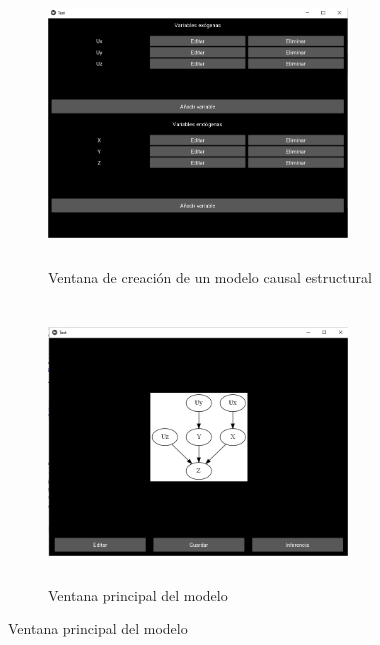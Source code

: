 \begin{figure}
	\centering
	\begin{subfigure}{\linewidth}
		\centering
		\includegraphics[width=300px, height=280px]{./images/Chapter-3/create-model}
		\caption{Ventana de creación de un modelo causal estructural}
		\label{fig:create-model}
	\end{subfigure}
	\begin{subfigure}{\linewidth}
		\centering
		\includegraphics[width=300px, height=280px]{./images/Chapter-3/model-view}
		\caption{Ventana principal del modelo}
		\label{fig:model-view}
	\end{subfigure}
\end{figure}

